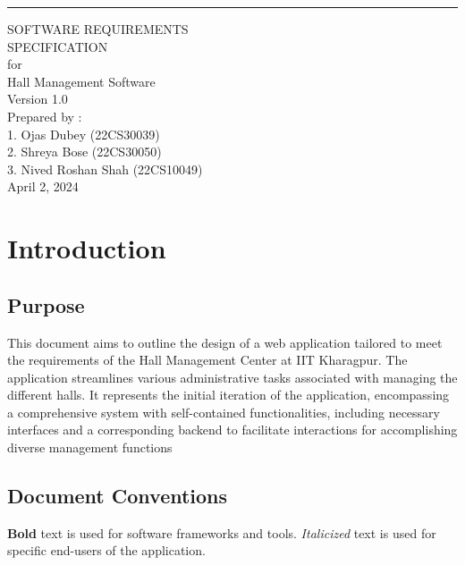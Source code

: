 \documentclass{scrreprt}
\date{}
\def\myversion{1.0 }
\begin{document}
\begin{flushleft}
    \rule{16cm}{5pt}\vskip1cm
    \begin{bfseries}
        \Huge{SOFTWARE REQUIREMENTS\\ SPECIFICATION}\\
        \vspace{1.5cm}
        for\\
        \vspace{1.5cm}
        Hall Management Software\\
        \vspace{1.5cm}
        \LARGE{Version \myversion}\\
        \vspace{1.5cm}
        Prepared by : \\1. Ojas Dubey (22CS30039)\\
        2. Shreya Bose (22CS30050)\\
        3. Nived Roshan Shah (22CS10049)\\
        \vspace{1.5cm}
        \vspace{1.5cm}
        April 2, 2024\\
    \end{bfseries}
\end{flushleft}

\tableofcontents

\chapter{Introduction}

\section{Purpose}

This document aims to outline the design of a web application tailored to meet the requirements of the Hall Management Center at IIT Kharagpur. The application streamlines various administrative tasks associated with managing the different halls. It represents the initial iteration of the application, encompassing a comprehensive system with self-contained functionalities, including necessary interfaces and a corresponding backend to facilitate interactions for accomplishing diverse management functions

\section{Document Conventions}
\textbf{Bold} text is used for software frameworks and tools.
\textit{Italicized} text is used for specific end-users of the application.
\end{document}
